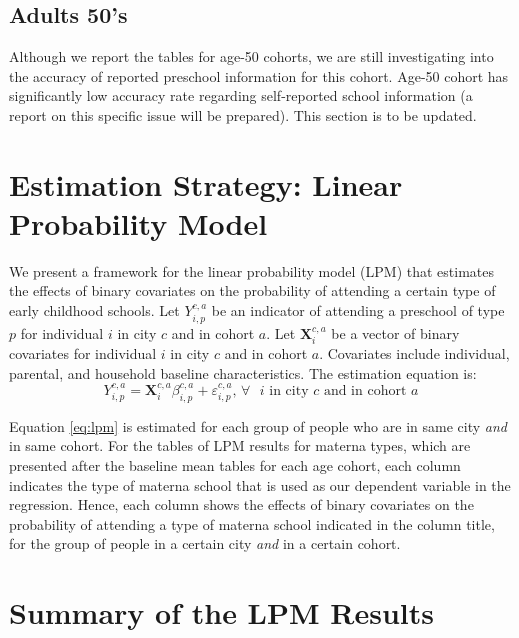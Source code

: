 \documentclass[12pt]{article}
\begin{document}
\subsection{Adults 50's}
Although we report the tables for age-50 cohorts, we are still investigating into the accuracy of reported preschool information for this cohort. Age-50 cohort has significantly low accuracy rate regarding self-reported school information (a report on this specific issue will be prepared). This section is to be updated. 


\section{Estimation Strategy: Linear Probability Model}
We present a framework for the linear probability model (LPM) that estimates the effects of binary covariates on the probability of attending a certain type of early childhood schools. Let $Y_{i,p}^{c,a}$ be an indicator of attending a preschool of type $p$ for individual $i$ in city $c$ and in cohort $a$. Let $\mathbf{X}_{i}^{c,a}$ be a vector of binary covariates for individual $i$ in city $c$ and in cohort $a$. Covariates include individual, parental, and household baseline characteristics. The estimation equation is:
\begin{equation} \label{eq:lpm}
Y_{i,p}^{c,a} = \mathbf{X}_{i}^{c,a}\beta_{i,p}^{c,a} + \varepsilon_{i,p}^{c,a} \text{, $\forall$ $i$ in city $c$ and in cohort $a$}
\end{equation}

Equation \ref{eq:lpm} is estimated for each group of people who are in same city \textit{and} in same cohort. For the tables of LPM results for materna types, which are presented after the baseline mean tables for each age cohort, each column indicates the type of materna school that is used as our dependent variable in the regression. Hence, each column shows the effects of binary covariates on the probability of attending a type of materna school indicated in the column title, for the group of people in a certain city \textit{and} in a certain cohort. 

\section{Summary of the LPM Results}
\end{document}
